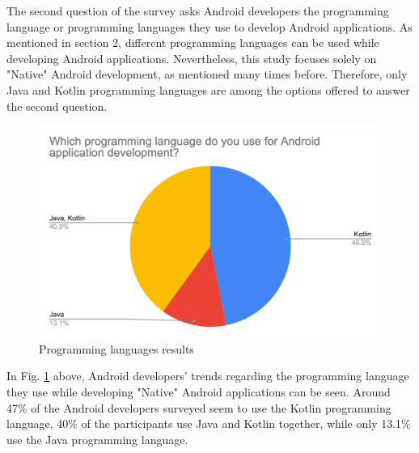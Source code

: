 The second question of the survey asks Android developers the programming language or programming languages they use to develop Android applications. As mentioned in section 2, different programming languages can be used while developing Android applications. Nevertheless, this study focuses solely on "Native" Android development, as mentioned many times before. Therefore, only Java and Kotlin programming languages are among the options offered to answer the second question.
\begin{figure}[ht!]
    \centering
    \includegraphics[scale=0.3]{figures/programming_language.png}
    \caption{Programming languages results}
    \label{fig:programming_languages}
\end{figure}

In Fig. \ref{fig:programming_languages} above, Android developers' trends regarding the programming language they use while developing "Native" Android applications can be seen. Around 47\% of the Android developers surveyed seem to use the Kotlin programming language. 40\% of the participants use Java and Kotlin together, while only 13.1\% use the Java programming language.
